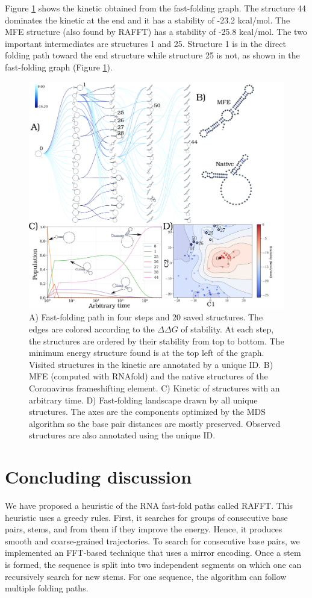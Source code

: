 \documentclass[a4paper,12pt]{article}
\begin{document}
Figure \ref{test_case} shows the kinetic obtained from the fast-folding graph. The
structure 44 dominates the kinetic at the end and it has a stability of -23.2
kcal/mol. The MFE structure (also found by RAFFT) has a stability of -25.8
kcal/mol. The two important intermediates are structures 1 and 25. Structure 1
is in the direct folding path toward the end structure while structure 25 is not,
as shown in the fast-folding graph (Figure \ref{test_case}).

\begin{figure}[h!]
\centering
\includegraphics[scale=0.18]{img/test_case.png}
\caption{\label{test_case}A) Fast-folding path in four steps and 20 saved structures. The edges are colored according to the \(\Delta \Delta G\) of stability. At each step, the structures are ordered by their stability from top to bottom. The minimum energy structure found is at the top left of the graph. Visited structures in the kinetic are annotated by a unique ID. B) MFE (computed with RNAfold) and the native structures of the Coronavirus frameshifting element. C) Kinetic of structures with an arbitrary time. D) Fast-folding landscape drawn by all unique structures. The axes are the components optimized by the MDS algorithm so the base pair distances are mostly preserved. Observed structures are also annotated using the unique ID.}
\end{figure}

\section*{Concluding discussion}
\label{sec:orgedf255b}
We have proposed a heuristic of the RNA fast-fold paths called RAFFT. This
heuristic uses a greedy rules. First, it searches for groups of consecutive base
pairs, stems, and from them if they improve the energy. Hence, it produces
smooth and coarse-grained trajectories. To search for consecutive base pairs, we
implemented an FFT-based technique that uses a mirror encoding. Once a stem is
formed, the sequence is split into two independent segments on which one can
recursively search for new stems. For one sequence, the algorithm can follow
multiple folding paths.
\end{document}
